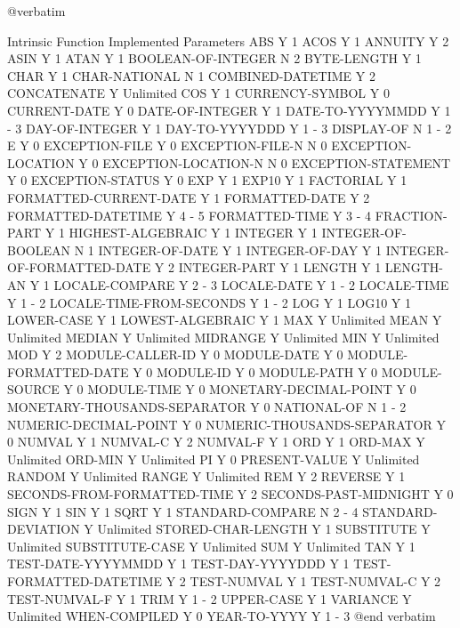 @verbatim

Intrinsic Function		Implemented	Parameters
ABS				Y		1
ACOS				Y		1
ANNUITY				Y		2
ASIN				Y		1
ATAN				Y		1
BOOLEAN-OF-INTEGER		N		2
BYTE-LENGTH			Y		1
CHAR				Y		1
CHAR-NATIONAL			N		1
COMBINED-DATETIME		Y		2
CONCATENATE			Y		Unlimited
COS				Y		1
CURRENCY-SYMBOL			Y		0
CURRENT-DATE			Y		0
DATE-OF-INTEGER			Y		1
DATE-TO-YYYYMMDD		Y		1 - 3
DAY-OF-INTEGER			Y		1
DAY-TO-YYYYDDD			Y		1 - 3
DISPLAY-OF			N		1 - 2
E				Y		0
EXCEPTION-FILE			Y		0
EXCEPTION-FILE-N		N		0
EXCEPTION-LOCATION		Y		0
EXCEPTION-LOCATION-N		N		0
EXCEPTION-STATEMENT		Y		0
EXCEPTION-STATUS		Y		0
EXP				Y		1
EXP10				Y		1
FACTORIAL			Y		1
FORMATTED-CURRENT-DATE		Y		1
FORMATTED-DATE			Y		2
FORMATTED-DATETIME		Y		4 - 5
FORMATTED-TIME			Y		3 - 4
FRACTION-PART			Y		1
HIGHEST-ALGEBRAIC		Y		1
INTEGER				Y		1
INTEGER-OF-BOOLEAN		N		1
INTEGER-OF-DATE			Y		1
INTEGER-OF-DAY			Y		1
INTEGER-OF-FORMATTED-DATE	Y		2
INTEGER-PART			Y		1
LENGTH				Y		1
LENGTH-AN			Y		1
LOCALE-COMPARE			Y		2 - 3
LOCALE-DATE			Y		1 - 2
LOCALE-TIME			Y		1 - 2
LOCALE-TIME-FROM-SECONDS	Y		1 - 2
LOG				Y		1
LOG10				Y		1
LOWER-CASE			Y		1
LOWEST-ALGEBRAIC		Y		1
MAX				Y		Unlimited
MEAN				Y		Unlimited
MEDIAN				Y		Unlimited
MIDRANGE			Y		Unlimited
MIN				Y		Unlimited
MOD				Y		2
MODULE-CALLER-ID		Y		0
MODULE-DATE			Y		0
MODULE-FORMATTED-DATE		Y		0
MODULE-ID			Y		0
MODULE-PATH			Y		0
MODULE-SOURCE			Y		0
MODULE-TIME			Y		0
MONETARY-DECIMAL-POINT		Y		0
MONETARY-THOUSANDS-SEPARATOR	Y		0
NATIONAL-OF			N		1 - 2
NUMERIC-DECIMAL-POINT		Y		0
NUMERIC-THOUSANDS-SEPARATOR	Y		0
NUMVAL				Y		1
NUMVAL-C			Y		2
NUMVAL-F			Y		1
ORD				Y		1
ORD-MAX				Y		Unlimited
ORD-MIN				Y		Unlimited
PI				Y		0
PRESENT-VALUE			Y		Unlimited
RANDOM				Y		Unlimited
RANGE				Y		Unlimited
REM				Y		2
REVERSE				Y		1
SECONDS-FROM-FORMATTED-TIME	Y		2
SECONDS-PAST-MIDNIGHT		Y		0
SIGN				Y		1
SIN				Y		1
SQRT				Y		1
STANDARD-COMPARE		N		2 - 4
STANDARD-DEVIATION		Y		Unlimited
STORED-CHAR-LENGTH		Y		1
SUBSTITUTE			Y		Unlimited
SUBSTITUTE-CASE			Y		Unlimited
SUM				Y		Unlimited
TAN				Y		1
TEST-DATE-YYYYMMDD		Y		1
TEST-DAY-YYYYDDD		Y		1
TEST-FORMATTED-DATETIME		Y		2
TEST-NUMVAL			Y		1
TEST-NUMVAL-C			Y		2
TEST-NUMVAL-F			Y		1
TRIM				Y		1 - 2
UPPER-CASE			Y		1
VARIANCE			Y		Unlimited
WHEN-COMPILED			Y		0
YEAR-TO-YYYY			Y		1 - 3
@end verbatim

